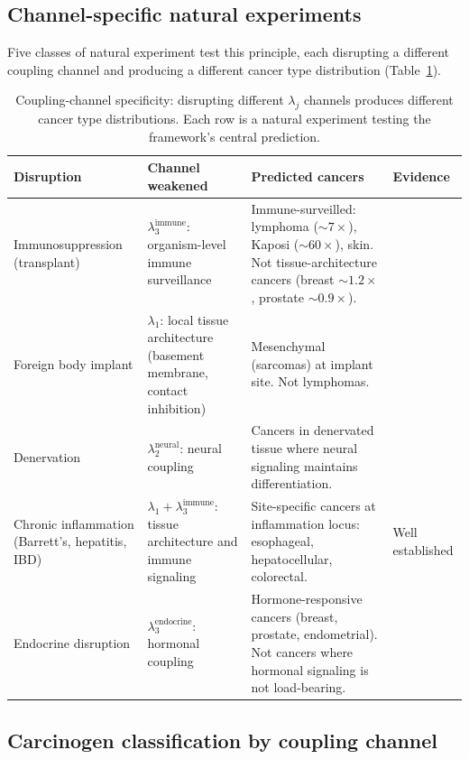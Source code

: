 \documentclass[11pt]{article}
\theoremstyle{definition}
\theoremstyle{remark}
\begin{document}
\subsection{Channel-specific natural experiments}

Five classes of natural experiment test this principle, each disrupting
a different coupling channel and producing a different cancer type
distribution (Table~\ref{tab:channels}).

\begin{table}[ht]
\centering
\small
\begin{tabular}{p{2.8cm} p{3.2cm} p{3.8cm} p{2.8cm}}
\hline
\textbf{Disruption} & \textbf{Channel weakened} & \textbf{Predicted cancers} & \textbf{Evidence} \\
\hline
Immunosuppression (transplant) &
$\lambda_3^{\mathrm{immune}}$: organism-level immune surveillance &
Immune-surveilled: lymphoma (${\sim}7\times$), Kaposi (${\sim}60\times$), skin.
Not tissue-architecture cancers (breast ${\sim}1.2\times$, prostate ${\sim}0.9\times$). &
\cite{Engels2011} \\[6pt]
Foreign body implant &
$\lambda_1$: local tissue architecture (basement membrane, contact inhibition) &
Mesenchymal (sarcomas) at implant site. Not lymphomas. &
\cite{Brand1975} \\[6pt]
Denervation &
$\lambda_2^{\mathrm{neural}}$: neural coupling &
Cancers in denervated tissue where neural signaling maintains differentiation. &
\cite{Zhao2017} \\[6pt]
Chronic inflammation (Barrett's, hepatitis, IBD) &
$\lambda_1 + \lambda_3^{\mathrm{immune}}$: tissue architecture and immune signaling &
Site-specific cancers at inflammation locus: esophageal, hepatocellular, colorectal. &
Well established \\[6pt]
Endocrine disruption &
$\lambda_3^{\mathrm{endocrine}}$: hormonal coupling &
Hormone-responsive cancers (breast, prostate, endometrial). Not cancers where hormonal signaling is not load-bearing. &
\cite{Herbst1971} \\
\hline
\end{tabular}
\caption{Coupling-channel specificity: disrupting different
$\lambda_j$ channels produces different cancer type distributions.
Each row is a natural experiment testing the framework's central
prediction.}
\label{tab:channels}
\end{table}

\subsection{Carcinogen classification by coupling channel}
\end{document}
